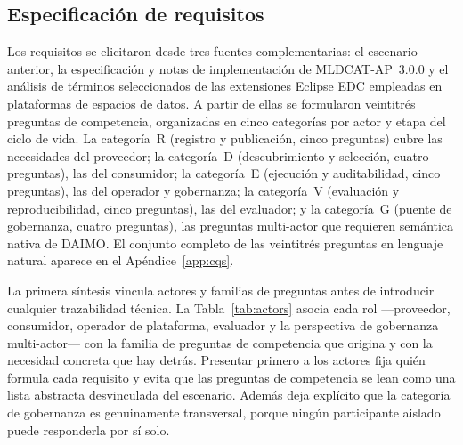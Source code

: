 \documentclass[Afour,sagev,times]{sagej}
\begin{document}
\subsection{Especificación de requisitos}\label{sec:method-req}

Los requisitos se elicitaron desde tres fuentes complementarias: el escenario anterior, la especificación y notas de implementación de MLDCAT-AP~3.0.0 y el análisis de términos seleccionados de las extensiones Eclipse EDC empleadas en plataformas de espacios de datos. A partir de ellas se formularon veintitrés preguntas de competencia, organizadas en cinco categorías por actor y etapa del ciclo de vida. La categoría~R (registro y publicación, cinco preguntas) cubre las necesidades del proveedor; la categoría~D (descubrimiento y selección, cuatro preguntas), las del consumidor; la categoría~E (ejecución y auditabilidad, cinco preguntas), las del operador y gobernanza; la categoría~V (evaluación y reproducibilidad, cinco preguntas), las del evaluador; y la categoría~G (puente de gobernanza, cuatro preguntas), las preguntas multi-actor que requieren semántica nativa de DAIMO. El conjunto completo de las veintitrés preguntas en lenguaje natural aparece en el Apéndice~\ref{app:cqs}.

La primera síntesis vincula actores y familias de preguntas antes de introducir cualquier trazabilidad técnica. La Tabla~\ref{tab:actors} asocia cada rol ---proveedor, consumidor, operador de plataforma, evaluador y la perspectiva de gobernanza multi-actor--- con la familia de preguntas de competencia que origina y con la necesidad concreta que hay detrás. Presentar primero a los actores fija quién formula cada requisito y evita que las preguntas de competencia se lean como una lista abstracta desvinculada del escenario. Además deja explícito que la categoría de gobernanza es genuinamente transversal, porque ningún participante aislado puede responderla por sí solo.
\end{document}
